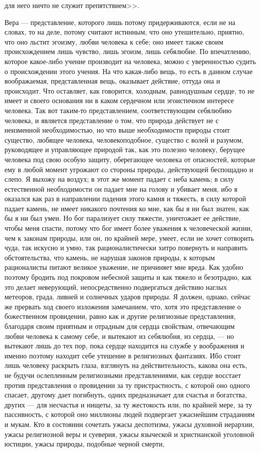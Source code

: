 \documentclass[12pt]{article}
\begin{document}
для него ничто не служит препятствием>>. 

Вера --- представление, которого лишь потому придерживаются, если не на словах, то на деле, потому считают истинным, что оно утешительно, приятно, что оно льстит эгоизму, любви человека к себе; оно имеет также своим происхождением лишь чувство, лишь эгоизм, лишь себялюбие. По впечатлению, которое какое-либо учение производит на человека, можно с уверенностью судить о происхождении этого учения. На что какая-либо вещь, то есть в данном случае воображаемая, представленная вещь, оказывает действие, оттуда она и происходит. Что оставляет, как говорится, холодным, равнодушным сердце, то не имеет и своего основания ни в каком сердечном или эгоистичном интересе человека. Так вот таким-то представлением, соответствующим себялюбию человека, и является представление о том, что природа действует не с неизменной необходимостью, но что выше необходимости природы стоит существо, любящее человека, человекоподобное, существо с волей и разумом, руководящее и управляющее природой так, как это полезно человеку, берущее человека под свою особую защиту, оберегающее человека от опасностей, которые ему в любой момент угрожают со стороны природы, действующей беспощадно и слепо. Я выхожу на воздух; в этот же момент падает с неба камень; в силу естественной необходимости он падает мне на голову и убивает меня, ибо я оказался как раз в направлении падения этого камня и тяжесть, в силу которой падает камень, не имеет никакого почтения ко мне, как бы я ни был знатен, как бы я ни был умен. Но бог парализует силу тяжести, уничтожает ее действие, чтобы меня спасти, потому что бог имеет более уважения к человеческой жизни, чем к законам природы, или он, по крайней мере, умеет, если не хочет сотворить чуда, так искусно и умно, так рационалистически хитро повернуть и направить обстоятельства, что камень, не нарушая законов природы, к которым рационалисты питают великое уважение, не причиняет мне вреда. Как удобно поэтому бродить под покровом небесной защиты и как тяжело и безотрадно, как это делает неверующий, непосредственно подвергаться действию наглых метеоров, града, ливней и солнечных ударов природы. Я должен, однако, сейчас же прервать ход своего изложения замечанием, что, хотя это представление о божественном провидении, равно как и другие религиозные представления, благодаря своим приятным и отрадным для сердца свойствам, отвечающим любви человека к самому себе, и вытекают из себялюбия, из сердца, --- но вытекают лишь до тех пор, пока сердце находится на службе у воображения и именно поэтому находит себе утешение в религиозных фантазиях. Ибо стоит лишь человеку раскрыть глаза, взглянуть на действительность, какова она есть, не будучи ослепленным религиозными представлениями, как сердце восстает против представления о провидении за ту пристрастность, с которой оно одного спасает, другому дает погибнуть, одних предназначает для счастья и богатства, других --- для несчастья и нищеты, за ту жестокость или, по крайней мере, за ту пассивность, с которой оно миллионы людей подвергает ужаснейшим страданиям и мукам. Кто в состоянии сочетать ужасы деспотизма, ужасы духовной иерархии, ужасы религиозной веры и суеверия, ужасы языческой и христианской уголовной юстиции, ужасы природы, подобные черной смерти, 
\end{document}
